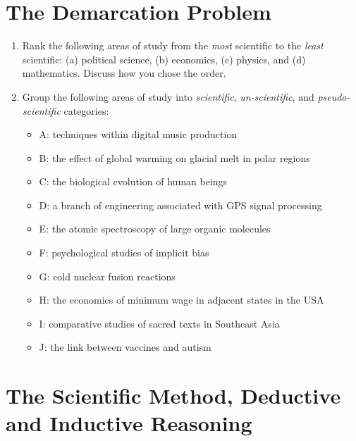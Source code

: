 \documentclass[12pt]{article}
\begin{document}
\maketitle

\section{The Demarcation Problem}

\begin{enumerate}
\item Rank the following areas of study from the \textit{most} scientific to the \textit{least} scientific: (a) political science, (b) economics, (c) physics, and (d) mathematics.  Discuss how you chose the order. \\ \vspace{1cm}
\item Group the following areas of study into \textit{scientific}, \textit{un-scientific}, and \textit{pseudo-scientific} categories:
\begin{itemize}
\footnotesize
\item A: techniques within digital music production
\item B: the effect of global warming on glacial melt in polar regions
\item C: the biological evolution of human beings
\item D: a branch of engineering associated with GPS signal processing
\item E: the atomic spectroscopy of large organic molecules
\item F: psychological studies of implicit bias
\item G: cold nuclear fusion reactions
\item H: the economics of minimum wage in adjacent states in the USA
\item I: comparative studies of sacred texts in Southeast Asia
\item J: the link between vaccines and autism 
\end{itemize}
\end{enumerate}

\section{The Scientific Method, Deductive and Inductive Reasoning}
\end{document}
